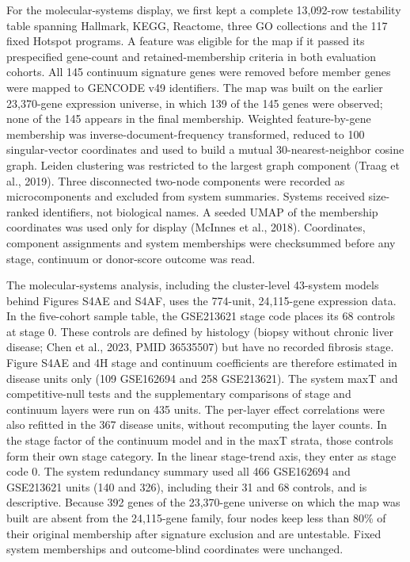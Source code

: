 For the molecular-systems display, we first kept a complete 13,092-row testability table spanning Hallmark, KEGG, Reactome, three GO collections and the 117 fixed Hotspot programs. A feature was eligible for the map if it passed its prespecified gene-count and retained-membership criteria in both evaluation cohorts. All 145 continuum signature genes were removed before member genes were mapped to GENCODE v49 identifiers. The map was built on the earlier 23,370-gene expression universe, in which 139 of the 145 genes were observed; none of the 145 appears in the final membership. Weighted feature-by-gene membership was inverse-document-frequency transformed, reduced to 100 singular-vector coordinates and used to build a mutual 30-nearest-neighbor cosine graph. Leiden clustering was restricted to the largest graph component (Traag et al., 2019). Three disconnected two-node components were recorded as microcomponents and excluded from system summaries. Systems received size-ranked identifiers, not biological names. A seeded UMAP of the membership coordinates was used only for display (McInnes et al., 2018). Coordinates, component assignments and system memberships were checksummed before any stage, continuum or donor-score outcome was read.

The molecular-systems analysis, including the cluster-level 43-system models behind Figures S4AE and S4AF, uses the 774-unit, 24,115-gene expression data. In the five-cohort sample table, the GSE213621 stage code places its 68 controls at stage 0. These controls are defined by histology (biopsy without chronic liver disease; Chen et al., 2023, PMID 36535507) but have no recorded fibrosis stage. Figure S4AE and 4H stage and continuum coefficients are therefore estimated in disease units only (109 GSE162694 and 258 GSE213621). The system maxT and competitive-null tests and the supplementary comparisons of stage and continuum layers were run on 435 units. The per-layer effect correlations were also refitted in the 367 disease units, without recomputing the layer counts. In the stage factor of the continuum model and in the maxT strata, those controls form their own stage category. In the linear stage-trend axis, they enter as stage code 0. The system redundancy summary used all 466 GSE162694 and GSE213621 units (140 and 326), including their 31 and 68 controls, and is descriptive. Because 392 genes of the 23,370-gene universe on which the map was built are absent from the 24,115-gene family, four nodes keep less than 80\% of their original membership after signature exclusion and are untestable. Fixed system memberships and outcome-blind coordinates were unchanged.

